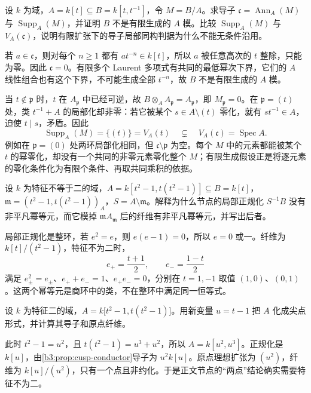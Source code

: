 \begin{exercise}\label{b3:ex:06-conductor-local-support}
	设 \(k\) 为域，\(A=k[t]\subseteq B=k[t,t^{-1}]\)，令 \(M=B/A\)。求导子 \(\mathfrak c=\operatorname{Ann}_A(M)\) 与 \(\operatorname{Supp}_A(M)\)，并证明 \(B\) 不是有限生成的 \(A\) 模。比较 \(\operatorname{Supp}_A(M)\) 与 \(V_A(\mathfrak c)\)，说明有限扩张下的导子局部同构判据为什么不能无条件沿用。
\end{exercise}
\begin{solution}
	若 \(a\in\mathfrak c\)，则对每个 \(n\ge1\) 都有 \(at^{-n}\in k[t]\)，所以 \(a\) 被任意高次的 \(t\) 整除，只能为零。因此 \(\mathfrak c=0\)。有限多个 Laurent 多项式有共同的最低幂次下界，它们的 \(A\) 线性组合也有这个下界，不可能生成全部 \(t^{-n}\)，故 \(B\) 不是有限生成的 \(A\) 模。

	当 \(t\notin\mathfrak p\) 时，\(t\) 在 \(A_{\mathfrak p}\) 中已经可逆，故 \(B\otimes_AA_{\mathfrak p}=A_{\mathfrak p}\)，即 \(M_{\mathfrak p}=0\)。在 \(\mathfrak p=(t)\) 处，类 \(t^{-1}+A\) 的局部化却非零：若它被某个 \(s\in A\setminus(t)\) 零化，就有 \(st^{-1}\in A\)，迫使 \(t\mid s\)，矛盾。因此
	\[
		\operatorname{Supp}_A(M)=\{(t)\}=V_A(t) \quad\subsetneq\quad V_A(\mathfrak c)=\operatorname{Spec}A.
	\]
	例如在 \(\mathfrak p=(0)\) 处两环局部化相同，但 \(\mathfrak c\setminus\mathfrak p\) 为空。每个 \(M\) 中的元素都能被某个 \(t\) 的幂零化，却没有一个共同的非零元素零化整个 \(M\)；有限生成假设正是将逐元素的零化条件化为有限个条件、再取共同乘积的依据。
\end{solution}

\begin{exercise}\label{b3:ex:06-node-local-idempotents}
	设 \(k\) 为特征不等于二的域，\(A=k[t^2-1,t(t^2-1)]\subseteq B=k[t]\)，\(\mathfrak m=(t^2-1,t(t^2-1))_A\)，\(S=A\setminus\mathfrak m\)。解释为什么节点的局部正规化 \(S^{-1}B\) 没有非平凡幂等元，而它模掉 \(\mathfrak mA_{\mathfrak m}\) 后的纤维有非平凡幂等元，并写出后者。
\end{exercise}
\begin{solution}
	局部正规化是整环，若 \(e^2=e\)，则 \(e(e-1)=0\)，所以 \(e=0\) 或一。纤维为 \(k[t]/(t^2-1)\)，特征不为二时，
	\[
		e_+=\frac{t+1}{2},\qquad e_-=\frac{1-t}{2}
	\]
	满足 \(e_\pm^2=e_\pm\)、\(e_++e_-=1\)、\(e_+e_-=0\)，分别在 \(t=1,-1\) 取值 \((1,0)\)、\((0,1)\)。这两个幂等元是商环中的类，不在整环中满足同一恒等式。
\end{solution}

\begin{exercise}\label{b3:ex:06-node-characteristic-two}
	设 \(k\) 为特征二的域，\(A=k\bigl[t^2-1,t(t^2-1)\bigr]\)。用新变量 \(u=t-1\) 把 \(A\) 化成尖点形式，并计算其导子和原点纤维。
\end{exercise}
\begin{solution}
	此时 \(t^2-1=u^2\)，且 \(t(t^2-1)=u^3+u^2\)，所以 \(A=k[u^2,u^3]\)。正规化是 \(k[u]\)，由\cref{b3:prop:cusp-conductor}导子为 \(u^2k[u]\)。原点理想扩张为 \((u^2)\)，纤维为 \(k[u]/(u^2)\)，只有一个点且非约化。于是正文节点的“两点”结论确实需要特征不为二。
\end{solution}

